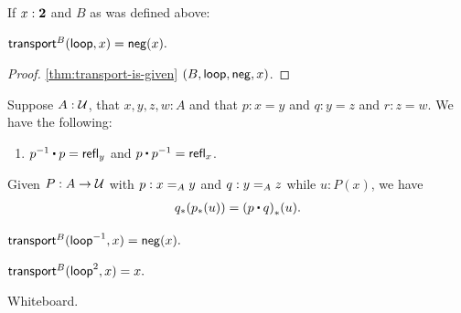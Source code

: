 \documentclass[centering]{report}
\newenvironment{slide}
    {\newpage
    \vspace*{\fill}
    }
    { 
     \vspace*{\fill}
    }
\begin{document}
\begin{slide}
If $x : \bool$ and $B$ as was defined above:
\begin{lem}\label{lem0}
  $\transfib{B}{\lloop}{x} = \mathsf{neg}(x).$
\end{lem}
\begin{proof}
  \cref{thm:transport-is-given} $(B, \lloop, \mathsf{neg}, x)$.
\end{proof}

{\color{gray}
\everymath{\color{gray}}
\begin{lem}\label{thm:omg}%
  Suppose $A:\type$, that $x,y,z,w:A$ and that $p:x= y$ and $q:y = z$ and $r:z=w$.
  We have the following:
  \begin{enumerate}
  \item $\opp{p}\ct p=  \refl{y}$ and $p\ct \opp{p}= \refl{x}$.\label{item:omg2}
  \end{enumerate}
\end{lem}


\begin{lem}\label{thm:transport-concat}
  Given $P:A\to\type$ with $p:\id[A]xy$ and $q:\id[A]yz$ while $u:P(x)$, we have
  \begin{align*}
    \trans{q}{\trans{p}{u}} = \trans{(p\ct q)}{u}.
  \end{align*}
\end{lem}
}
\begin{lem}\label{lem1}
  $\transfib{B}{\lloop^{-1}}{x} = \mathsf{neg}(x).$
\end{lem}

\begin{lem}\label{lem2}
$\transfib{B}{\lloop^2}{x} = x.$
\end{lem}
\end{slide}

\begin{slide}
Whiteboard.
\end{slide}
\end{document}
